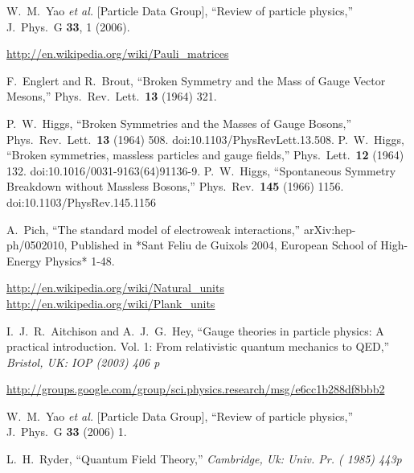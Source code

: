 \begin{thebibliography}{999}
  W.~M.~Yao {\it et al.}  [Particle Data Group],
  ``Review of particle physics,''
  J.\ Phys.\ G {\bf 33}, 1 (2006).

\url{http://en.wikipedia.org/wiki/Pauli_matrices}

  F.~Englert and R.~Brout,
  ``Broken Symmetry and the Mass of Gauge Vector Mesons,''
  Phys.\ Rev.\ Lett.\  {\bf 13} (1964) 321.

  P.~W.~Higgs,
  ``Broken Symmetries and the Masses of Gauge Bosons,''
  Phys.\ Rev.\ Lett.\  {\bf 13} (1964) 508.
  doi:10.1103/PhysRevLett.13.508.
  P.~W.~Higgs,
  ``Broken symmetries, massless particles and gauge fields,''
  Phys.\ Lett.\  {\bf 12} (1964) 132.
  doi:10.1016/0031-9163(64)91136-9.
  P.~W.~Higgs,
  ``Spontaneous Symmetry Breakdown without Massless Bosons,''
  Phys.\ Rev.\  {\bf 145} (1966) 1156.
  doi:10.1103/PhysRev.145.1156



  A.~Pich,
  ``The standard model of electroweak interactions,''
  arXiv:hep-ph/0502010,
  Published in *Sant Feliu de Guixols 2004, European School of High-Energy Physics* 1-48.

\url{http://en.wikipedia.org/wiki/Natural_units}
\url{http://en.wikipedia.org/wiki/Plank_units}

  I.~J.~R.~Aitchison and A.~J.~G.~Hey,
  ``Gauge theories in particle physics: A practical introduction. Vol. 1: From
  relativistic quantum mechanics to QED,''
{\it  Bristol, UK: IOP (2003) 406 p}

\url{http://groups.google.com/group/sci.physics.research/msg/e6cc1b288df8bbb2}

 W.~M.~Yao {\it et al.}  [Particle Data Group],
  ``Review of particle physics,''
  J.\ Phys.\ G {\bf 33} (2006) 1.

  L.~H.~Ryder,
  ``Quantum Field Theory,''
{\it  Cambridge, Uk: Univ. Pr. ( 1985) 443p}


\end{thebibliography}
